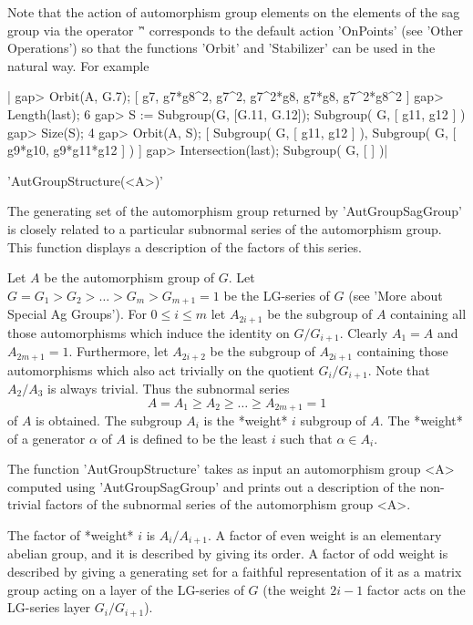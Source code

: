 \bigskip

Note that the action of automorphism group elements on the elements of the sag
group via the operator '\^' corresponds to the default action 'OnPoints'
(see 'Other Operations') so that the functions 'Orbit' and 'Stabilizer' can
be used in the natural way. For example\:

|    gap> Orbit(A, G.7);
    [ g7, g7*g8^2, g7^2, g7^2*g8, g7*g8, g7^2*g8^2 ]
    gap> Length(last);
    6
    gap> S := Subgroup(G, [G.11, G.12]);
    Subgroup( G, [ g11, g12 ] )
    gap> Size(S);
    4
    gap> Orbit(A, S);
    [ Subgroup( G, [ g11, g12 ] ), Subgroup( G, [ g9*g10, g9*g11*g12 ] ) ]
    gap> Intersection(last);
    Subgroup( G, [  ] )|



'AutGroupStructure(<A>)'

The generating set of the automorphism group returned by 'AutGroupSagGroup' is
closely  related to a  particular subnormal series  of the automorphism group.
This function displays a description of the factors of this series.


Let  $A$ be the automorphism group  of $G$. Let $G=G_1 >  G_2 > \ldots > G_m >
G_{m+1}=1$  be the LG-series of $G$ (see  'More about Special Ag Groups'). For
$0  \leq i \leq m$ let $A_{2i+1}$ be  the subgroup of $A$ containing all those
automorphisms  which induce the identity on $G/G_{i+1}$. Clearly $A_1 = A$ and
$A_{2m+1}  = 1$.  Furthermore, let  $A_{2i+2}$ be  the subgroup  of $A_{2i+1}$
containing those automorphisms which also act trivially on the quotient $G_i /
G_{i+1}$. Note that $A_2/A_3$ is always trivial. Thus the subnormal series
%
$$A = A_1 \geq A_2 \geq \ldots \geq A_{2m+1} = 1$$
%
of $A$ is obtained. The subgroup $A_i$ is the *weight* $i$ subgroup of $A$.
The *weight* of a generator $\alpha$ of $A$ is defined to be the least $i$
such that $\alpha \in A_{i}$.


The  function  'AutGroupStructure'  takes  as  input an automorphism group <A>
computed  using  'AutGroupSagGroup'  and  prints  out  a  description  of  the
non-trivial factors of the subnormal series of the automorphism group <A>.


The  factor of *weight*  $i$ is $A_i/A_{i+1}$.  A factor of  even weight is an
elementary abelian group, and it is described by giving its order. A factor of
odd   weight  is  described  by  giving   a  generating  set  for  a  faithful
representation  of it as a matrix group acting  on a layer of the LG-series of
$G$ (the weight $2i-1$ factor acts on the LG-series layer $G_i/G_{i+1}$).


